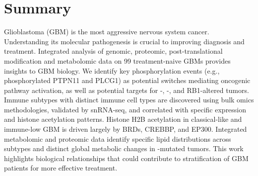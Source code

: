 \section{Summary}
Glioblastoma (GBM) is the most aggressive nervous system cancer. Understanding its molecular pathogenesis is crucial to improving diagnosis and treatment. Integrated analysis of genomic, proteomic, post-translational modification and metabolomic data on 99 treatment-naive GBMs provides insights to GBM biology. We identify key phosphorylation events (e.g., phosphorylated PTPN11 and PLCG1) as potential switches mediating oncogenic pathway activation, as well as potential targets for -, -, and RB1-altered tumors. Immune subtypes with distinct immune cell types are discovered using bulk omics methodologies, validated by snRNA-seq, and correlated with specific expression and histone acetylation patterns. Histone H2B acetylation in classical-like and immune-low GBM is driven largely by BRDs, CREBBP, and EP300. Integrated metabolomic and proteomic data identify specific lipid distributions across subtypes and distinct global metabolic changes in -mutated tumors. This work highlights biological relationships that could contribute to stratification of GBM patients for more effective treatment.

